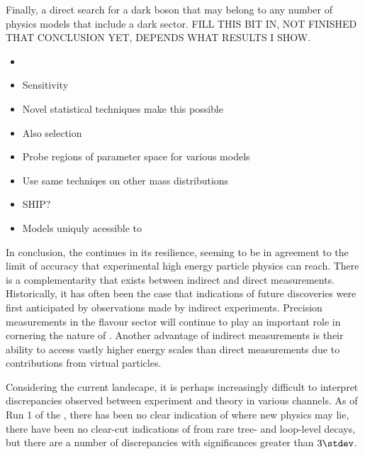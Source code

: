 
Finally, a direct search for a dark boson that may belong to any number of \bsm physics models that
include a dark sector.
FILL THIS BIT IN, NOT FINISHED THAT CONCLUSION YET, DEPENDS WHAT RESULTS I SHOW.
\begin{itemize}
  \item \btokstrdb
  \item Sensitivity
  \item Novel statistical techniques make this possible
  \item Also selection
  \item Probe regions of parameter space for various models
  \item Use same techniqes on other mass distributions
  \item SHIP?
  \item Models uniquly acessible to \lhcb
\end{itemize}



In conclusion, the \sm continues in its resilience, seeming to be in agreement to the limit of
accuracy that experimental high energy particle physics can reach.
There is a complementarity that exists between indirect and direct measurements.
Historically, it has often been the case that indications of future discoveries were first
anticipated by observations made by indirect experiments.
Precision measurements in the flavour sector will continue to play an important role in cornering
the nature of \np.
Another advantage of indirect measurements is their ability to access vastly higher energy scales
than direct measurements due to contributions from virtual particles.

Considering the current landscape, it is perhaps increasingly difficult to interpret
discrepancies observed between experiment and theory in various channels.
As of Run 1 of the \lhc, there has been no clear indication of where new physics may lie, there
have been no clear-cut indications of \np from rare tree- and loop-level decays, but there are a
number of discrepancies with significances greater than $3\stdev$.

